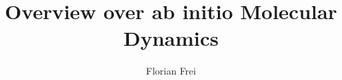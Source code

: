 \documentclass[12pt]{scrartcl}
\begin{document}
\author{Florian Frei}
\title{Overview over ab initio Molecular Dynamics}

\maketitle

\newpage

\tableofcontents

\newpage




\end{document}
